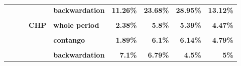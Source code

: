 \documentclass[
  authoryear,
  preprint,
  3p]{elsarticle}
\begin{document}
\begin{landscape}
\begin{longtable}[t]{>{}l>{}l>{}l>{}l>{}l>{}r>{}r>{}r>{}r}
\textbf{} & \textbf{} & \textbf{} & \textbf{} & \textbf{backwardation} & \textcolor[HTML]{4285f4}{\textbf{11.26\%}} & \textcolor[HTML]{4285f4}{\textbf{23.68\%}} & \textcolor[HTML]{4285f4}{\textbf{28.95\%}} & \textcolor[HTML]{4285f4}{\textbf{13.12\%}}\\
\textbf{\cellcolor{gray!10}{}} & \textbf{\cellcolor{gray!10}{}} & \textbf{\cellcolor{gray!10}{}} & \textbf{\cellcolor{gray!10}{}} & \textbf{\cellcolor{gray!10}{contango}} & \textcolor[HTML]{4285f4}{\textbf{\cellcolor{gray!10}{12.22\%}}} & \textcolor[HTML]{4285f4}{\textbf{\cellcolor{gray!10}{19.97\%}}} & \textcolor[HTML]{4285f4}{\textbf{\cellcolor{gray!10}{32.48\%}}} & \textcolor[HTML]{4285f4}{\textbf{\cellcolor{gray!10}{17.66\%}}}\\
\addlinespace
\textbf{} & \textbf{} & \textbf{} & \textbf{CHP} & \textbf{whole period} & \textcolor[HTML]{4285f4}{\textbf{2.38\%}} & \textcolor[HTML]{4285f4}{\textbf{5.8\%}} & \textcolor[HTML]{4285f4}{\textbf{5.39\%}} & \textcolor[HTML]{4285f4}{\textbf{4.47\%}}\\
\textbf{\cellcolor{gray!10}{}} & \textbf{\cellcolor{gray!10}{}} & \textbf{\cellcolor{gray!10}{}} & \textbf{\cellcolor{gray!10}{}} & \textbf{\cellcolor{gray!10}{backwardation}} & \textcolor[HTML]{4285f4}{\textbf{\cellcolor{gray!10}{3.19\%}}} & \textcolor[HTML]{4285f4}{\textbf{\cellcolor{gray!10}{5.94\%}}} & \textcolor[HTML]{4285f4}{\textbf{\cellcolor{gray!10}{4.72\%}}} & \textcolor[HTML]{4285f4}{\textbf{\cellcolor{gray!10}{5.54\%}}}\\
\textbf{} & \textbf{} & \textbf{} & \textbf{} & \textbf{contango} & \textcolor[HTML]{4285f4}{\textbf{1.89\%}} & \textcolor[HTML]{4285f4}{\textbf{6.1\%}} & \textcolor[HTML]{4285f4}{\textbf{6.14\%}} & \textcolor[HTML]{4285f4}{\textbf{4.79\%}}\\
\textbf{\cellcolor{gray!10}{}} & \textbf{\cellcolor{gray!10}{}} & \textbf{\cellcolor{gray!10}{}} & \textbf{\cellcolor{gray!10}{open interest}} & \textbf{\cellcolor{gray!10}{whole period}} & \textcolor[HTML]{4285f4}{\textbf{\cellcolor{gray!10}{7.45\%}}} & \textcolor[HTML]{4285f4}{\textbf{\cellcolor{gray!10}{6.95\%}}} & \textcolor[HTML]{4285f4}{\textbf{\cellcolor{gray!10}{4.57\%}}} & \textcolor[HTML]{4285f4}{\textbf{\cellcolor{gray!10}{5.29\%}}}\\
\textbf{} & \textbf{} & \textbf{} & \textbf{} & \textbf{backwardation} & \textcolor[HTML]{4285f4}{\textbf{7.1\%}} & \textcolor[HTML]{4285f4}{\textbf{6.79\%}} & \textcolor[HTML]{4285f4}{\textbf{4.5\%}} & \textcolor[HTML]{4285f4}{\textbf{5\%}}\\

\end{longtable}
\end{landscape}
\end{document}
